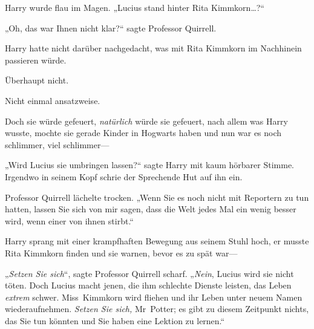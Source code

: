 Harry wurde flau im Magen. „Lucius stand hinter Rita Kimmkorn…?“

„Oh, das war Ihnen nicht klar?“ sagte Professor Quirrell.

Harry hatte nicht darüber nachgedacht, was mit Rita Kimmkorn im Nachhinein passieren würde.

Überhaupt nicht.

Nicht einmal ansatzweise.

Doch sie würde gefeuert, \emph{natürlich} würde sie gefeuert, nach allem was Harry wusste, mochte sie gerade Kinder in Hogwarts haben und nun war es noch schlimmer, viel schlimmer—

„Wird Lucius sie umbringen lassen?“ sagte Harry mit kaum hörbarer Stimme. Irgendwo in seinem Kopf schrie der Sprechende Hut auf ihn ein.

Professor Quirrell lächelte trocken. „Wenn Sie es noch nicht mit Reportern zu tun hatten, lassen Sie sich von mir sagen, dass die Welt jedes Mal ein wenig besser wird, wenn einer von ihnen stirbt.“

Harry sprang mit einer krampfhaften Bewegung aus seinem Stuhl hoch, er musste Rita Kimmkorn finden und sie warnen, bevor es zu spät war—

„\emph{Setzen Sie sich}“, sagte Professor Quirrell scharf. „\emph{Nein}, Lucius wird sie nicht töten. Doch Lucius macht jenen, die ihm schlechte Dienste leisten, das Leben \emph{extrem} schwer. Miss~Kimmkorn wird fliehen und ihr Leben unter neuem Namen wiederaufnehmen. \emph{Setzen Sie sich,} Mr~Potter; es gibt zu diesem Zeitpunkt nichts, das Sie tun könnten und Sie haben eine Lektion zu lernen.“


